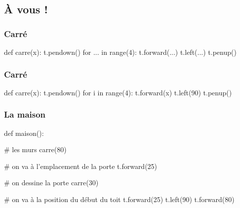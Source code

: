 \documentclass{beamer}
\begin{document}
   \subsection{À vous !}\label{subsec:a-vous}

\begin{frame}[fragile]
   \frametitle{Carré}

   \begin{pyverbatim}
            def carre(x):
               t.pendown()
               for ... in range(4):
                  t.forward(...)
                  t.left(...)
               t.penup()
   \end{pyverbatim}
\end{frame}

\begin{frame}[fragile]
   \frametitle{Carré}

   \begin{pyverbatim}
            def carre(x):
               t.pendown()
               for i in range(4):
                  t.forward(x)
                  t.left(90)
               t.penup()
   \end{pyverbatim}
\end{frame}


\begin{frame}[fragile]
   \frametitle{La maison}

   \begin{pyverbatim}
      def maison():
   \end{pyverbatim}
   \pause
   \begin{pyverbatim}
         # les murs
         carre(80)
   \end{pyverbatim}
   \pause
   \begin{pyverbatim}
         # on va à l'emplacement de la porte
         t.forward(25)
   \end{pyverbatim}
   \pause
   \begin{pyverbatim}
         # on dessine la porte
         carre(30)
   \end{pyverbatim}
   \pause
   \begin{pyverbatim}
         # on va à la position du début du toit
         t.forward(25)
         t.left(90)
         t.forward(80)
   \end{pyverbatim}
\end{frame}
\end{document}
